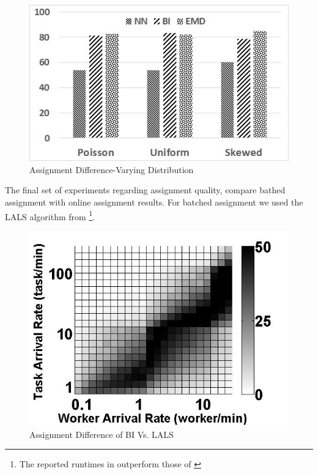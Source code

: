 \begin{figure}[h]
	\centering
	\includegraphics[scale=0.25]{figures/dists.jpg}
	\vspace{-0.1in}
	\caption{Assignment Difference-Varying Distribution}\label{fig:dists}
\end{figure}

The final set of experiments regarding assignment quality, compare bathed assignment with online assignment results. For batched assignment we used the LALS algorithm from \cite{Deng15} \footnote{The reported runtimes in \cite{Deng15} outperform those of \cite{Chen15}}.

\begin{figure}[h]
	\centering
	\includegraphics[scale=0.25]{figures/bi_lals.jpg}
	\vspace{-0.1in}
	\caption{Assignment Difference of BI Vs. LALS}\label{fig:bi_lals}
\end{figure}


